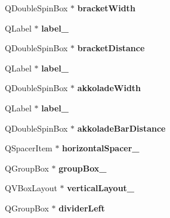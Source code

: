 \begin{DoxyCompactItemize}
Q\+Double\+Spin\+Box $\ast$ {\bfseries bracket\+Width}
\item 
\mbox{\label{class_ui___edit_style_base_ac4af93a04dacef30e54ac418990fc101}} 
Q\+Label $\ast$ {\bfseries label\+\_}
\item 
\mbox{\label{class_ui___edit_style_base_acab93e05993eb2d695de90311292ddd8}} 
Q\+Double\+Spin\+Box $\ast$ {\bfseries bracket\+Distance}
\item 
\mbox{\label{class_ui___edit_style_base_aacb547510a22a32a8bdbe90d63ae0505}} 
Q\+Label $\ast$ {\bfseries label\+\_}
\item 
\mbox{\label{class_ui___edit_style_base_af967c3904d71d9c7eeff5b421653aa59}} 
Q\+Double\+Spin\+Box $\ast$ {\bfseries akkolade\+Width}
\item 
\mbox{\label{class_ui___edit_style_base_a8bbf9dcccd55c3d4e1d0ea9886001d82}} 
Q\+Label $\ast$ {\bfseries label\+\_}
\item 
\mbox{\label{class_ui___edit_style_base_a5a8320b9bb855ea932e36fd6dbeef230}} 
Q\+Double\+Spin\+Box $\ast$ {\bfseries akkolade\+Bar\+Distance}
\item 
\mbox{\label{class_ui___edit_style_base_aa91489f5201ed2abb63ee047c77c7f68}} 
Q\+Spacer\+Item $\ast$ {\bfseries horizontal\+Spacer\+\_}
\item 
\mbox{\label{class_ui___edit_style_base_af2b035b2379fe6a60f866a53911439e4}} 
Q\+Group\+Box $\ast$ {\bfseries group\+Box\+\_}
\item 
\mbox{\label{class_ui___edit_style_base_ae573f9b64ba6449ec0c954346bdc015c}} 
Q\+V\+Box\+Layout $\ast$ {\bfseries vertical\+Layout\+\_}
\item 
\mbox{\label{class_ui___edit_style_base_a3e1dd97dfb19c91324acb37c4d5da739}} 
Q\+Group\+Box $\ast$ {\bfseries divider\+Left}
\item 

\end{DoxyCompactItemize}
